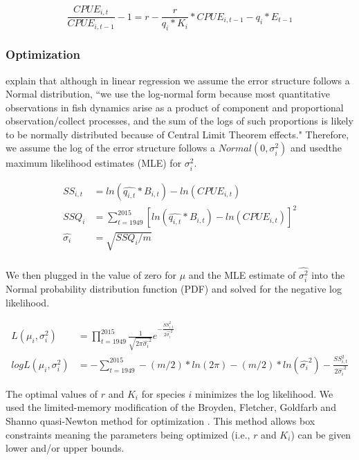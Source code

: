\documentclass[oneside,12pt,final]{sty/ucthesis-CA2012}
\let\cite\citep                             %
\begin{document}
\begin{mainmatter}
\begin{equation} \label{regression}
\frac{CPUE_{i,t}}{CPUE_{i,t-1} } -1 = r -\frac{r}{q_i*K_i}*CPUE_{i,t-1}  - q_i*E_{t-1} 
\end{equation}

\subsubsection*{Optimization} 
\citet{walters_fisheries_2004} explain that although in linear regression we assume the error structure follows a Normal distribution, ``we use the log-normal form because most quantitative observations in fish dynamics arise as a product of component and proportional observation/collect processes, and the sum of the logs of such proportions is likely to be normally distributed because of Central Limit Theorem effects." Therefore, we assume the log of the error structure follows a $Normal(0,\sigma_i^2)$ and usedthe maximum likelihood estimates (MLE) for $\sigma_i^2$.  

 \begin{align*}
SS_{i,t} & = ln(\widehat{q_{i,t}}*B_{i,t}) - ln(CPUE_{i,t}) \\
SSQ_i & = \sum_{t=1949}^{2015}[ln(\widehat{q_{i,t}}*B_{i,t}) - ln(CPUE_{i,t})]^2  \\
\widehat{\sigma_i} &=\sqrt{SSQ_i/m} \\
\end{align*} 

We then plugged in the value of zero for $\mu$ and the MLE estimate of $\widehat{\sigma_i^2}$ into the Normal probability distribution function (PDF) and solved for the negative log likelihood. 

\begin{align*}
L(\mu_i,\sigma_i^2) &= \prod_{t=1949}^{2015} \frac{1}{\sqrt{2\pi\widehat{\sigma_i}^2}}e^{-\frac{SS_{i,t}^2}{2\widehat{\sigma_i}^2}} \\
logL(\mu_i,\sigma_i^2) &= - \sum_{t=1949}^{2015} -(m/2)*ln(2\pi) - (m/2)*ln(\widehat{\sigma_i}^2) - \frac{SS_{i,t}^2}{2\widehat{\sigma_i}^2}
\end{align*}

The optimal values of $r$ and $K_i$ for species $i$ minimizes the log likelihood. We used the limited-memory modification of the Broyden, Fletcher, Goldfarb and Shanno quasi-Newton method for optimization \cite{shanno1970conditioning,byrd1995limited}. This method allows box constraints meaning the parameters being optimized (i.e., $r$ and $K_i$) can be given lower and/or upper bounds. 


\end{mainmatter}
\end{document}
